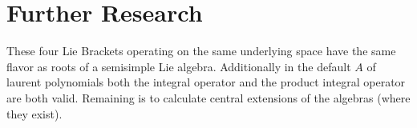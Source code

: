 \documentclass[10pt, oneside]{article}
\begin{document}
   \section{Further Research}
   These four Lie Brackets operating on the same underlying space have the same flavor as roots of a semisimple Lie algebra. 
   Additionally in the default $A$ of laurent polynomials both the integral operator and the product integral operator are both valid. 
   Remaining is to calculate central extensions of the algebras (where they exist).
\end{document}

